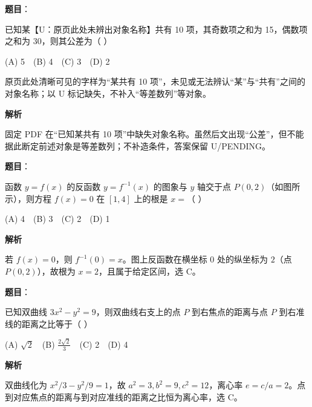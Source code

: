 \begin{answer}

\textbf{题目}：

已知某【U：原页此处未辨出对象名称】共有 10 项，其奇数项之和为 15，偶数项之和为 30，则其公差为（  ）

(A) 5　(B) 4　(C) 3　(D) 2

\begin{gktip}
原页此处清晰可见的字样为“某共有 10 项”，未见或无法辨认“某”与“共有”之间的对象名称；以 U 标记缺失，不补入“等差数列”等对象。
\end{gktip}

\textbf{解析}

固定 PDF 在“已知某共有 10 项”中缺失对象名称。虽然后文出现“公差”，但不能据此断定前述对象是等差数列；不补造条件，答案保留 U/PENDING。


\end{answer}
\begin{answer}

\textbf{题目}：

函数 \(y=f(x)\) 的反函数 \(y=f^{-1}(x)\) 的图象与 \(y\) 轴交于点 \(P(0,2)\)（如图所示），则方程 \(f(x)=0\) 在 \([1,4]\) 上的根是 \(x=\)（  ）

(A) 4　(B) 3　(C) 2　(D) 1
\nopagebreak[4]
\begin{center}\end{center}
\nopagebreak[4]
\textbf{解析}

若 $f(x)=0$，则 $f^{-1}(0)=x$。图上反函数在横坐标 $0$ 处的纵坐标为 $2$（点 $P(0,2)$），故根为 $x=2$，且属于给定区间，选 C。


\end{answer}
\begin{answer}

\textbf{题目}：

已知双曲线 \(3x^2-y^2=9\)，则双曲线右支上的点 \(P\) 到右焦点的距离与点 \(P\) 到右准线的距离之比等于（  ）

(A) \(\sqrt2\)　(B) \(\frac{2\sqrt2}{3}\)　(C) 2　(D) 4

\textbf{解析}

双曲线化为 $x^2/3-y^2/9=1$，故 $a^2=3,b^2=9,c^2=12$，离心率 $e=c/a=2$。点到对应焦点的距离与到对应准线的距离之比恒为离心率，选 C。


\end{answer}
